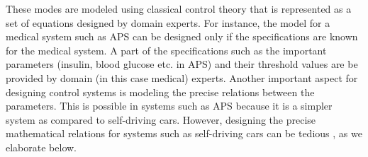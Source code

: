 These modes are modeled using classical control theory that is represented as a set of equations designed by domain experts.
For instance, the model for a medical system such as \ac{APS} can be designed only if the specifications are known for the medical system. 
A part of the specifications such as the important parameters (insulin, blood glucose etc. in APS) and their threshold values are be provided by domain (in this case medical) experts. 
Another important aspect for designing control systems is modeling the precise relations between the parameters. 
This is possible in systems such as APS because it is a simpler system as compared to self-driving cars. 
However, designing the precise mathematical relations for systems such as self-driving cars can be tedious \cite{article23}, as we elaborate below.

